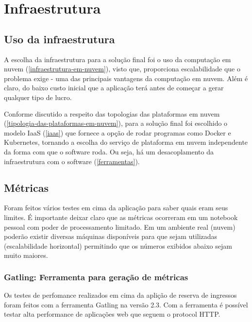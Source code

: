 \chapter{Infraestrutura}

\section{Uso da infraestrutura}

A escolha da infraestrutura para a solução final foi o uso da
computação em nuvem (\autoref{infraestrutura-em-nuvem}), visto que, proporciona
escalabilidade que o problema exige - uma das principais vantagens da computação em nuvem.
Além é claro, do baixo custo inicial que a aplicação terá antes de começar a gerar qualquer
tipo de lucro.

Conforme discutido a respeito das topologias das plataformas em
nuvem (\autoref{tipologia-das-plataformas-em-nuvem}), para a solução final foi escolhido o
modelo IaaS (\autoref{iaas}) que fornece a opção de rodar programas como Docker e
Kubernetes, tornando a escolha do serviço de plataforma em nuvem independente da forma
com que o software roda. Ou seja, há um desacoplamento da infraestrutura com o software
(\autoref{ferramentas}).

\section{Métricas}

Foram feitos vários testes em cima da aplicação para saber quais eram seus limites.
É importante deixar claro que as métricas ocorreram em um notebook pessoal com poder
de processamento limitado. Em um ambiente real (nuvem) poderão existir diversas máquinas
disponíveis para que sejam utilizadas (escalabilidade horizontal) permitindo que os
números exibidos abaixo sejam muito maiores.

\subsection{Gatling: Ferramenta para geração de métricas}

Os testes de perfomance realizados em cima da aplição de reserva de ingressos foram
feitos com a ferramenta Gatling na versão 2.3.
Com a ferramenta é possível testar alta performance de aplicações web
\cite{gatling-docs} que seguem o protocol HTTP.

